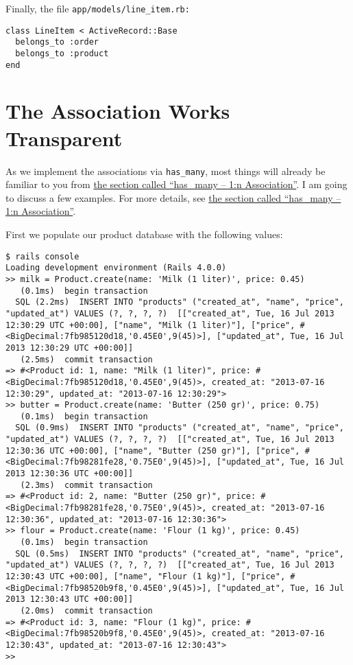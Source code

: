 \documentclass[a4paper]{book}
\newcounter{tab}[chapter]
\begin{document}
Finally, the file \texttt{app/models/line\_item.rb:}

\begin{shaded}\begin{verbatim}
class LineItem < ActiveRecord::Base
  belongs_to :order
  belongs_to :product
end
\end{verbatim}\end{shaded}

\section{The Association Works Transparent}\label{the-association-works-transparent}

As we implement the associations via \texttt{has\_many}, most things will already be familiar to you from \hyperref[activerecordux5fhasux5fmany]{the section called “has\_many -- 1:n Association”}. I am going to discuss a few examples. For more details, see \hyperref[activerecordux5fhasux5fmany]{the section called “has\_many -- 1:n Association”}.

First we populate our product database with the following values:

\begin{shaded}\begin{verbatim}
$ rails console
Loading development environment (Rails 4.0.0)
>> milk = Product.create(name: 'Milk (1 liter)', price: 0.45)
   (0.1ms)  begin transaction
  SQL (2.2ms)  INSERT INTO "products" ("created_at", "name", "price", "updated_at") VALUES (?, ?, ?, ?)  [["created_at", Tue, 16 Jul 2013 12:30:29 UTC +00:00], ["name", "Milk (1 liter)"], ["price", #<BigDecimal:7fb985120d18,'0.45E0',9(45)>], ["updated_at", Tue, 16 Jul 2013 12:30:29 UTC +00:00]]
   (2.5ms)  commit transaction
=> #<Product id: 1, name: "Milk (1 liter)", price: #<BigDecimal:7fb985120d18,'0.45E0',9(45)>, created_at: "2013-07-16 12:30:29", updated_at: "2013-07-16 12:30:29">
>> butter = Product.create(name: 'Butter (250 gr)', price: 0.75)
   (0.1ms)  begin transaction
  SQL (0.9ms)  INSERT INTO "products" ("created_at", "name", "price", "updated_at") VALUES (?, ?, ?, ?)  [["created_at", Tue, 16 Jul 2013 12:30:36 UTC +00:00], ["name", "Butter (250 gr)"], ["price", #<BigDecimal:7fb98281fe28,'0.75E0',9(45)>], ["updated_at", Tue, 16 Jul 2013 12:30:36 UTC +00:00]]
   (2.3ms)  commit transaction
=> #<Product id: 2, name: "Butter (250 gr)", price: #<BigDecimal:7fb98281fe28,'0.75E0',9(45)>, created_at: "2013-07-16 12:30:36", updated_at: "2013-07-16 12:30:36">
>> flour = Product.create(name: 'Flour (1 kg)', price: 0.45)
   (0.1ms)  begin transaction
  SQL (0.5ms)  INSERT INTO "products" ("created_at", "name", "price", "updated_at") VALUES (?, ?, ?, ?)  [["created_at", Tue, 16 Jul 2013 12:30:43 UTC +00:00], ["name", "Flour (1 kg)"], ["price", #<BigDecimal:7fb98520b9f8,'0.45E0',9(45)>], ["updated_at", Tue, 16 Jul 2013 12:30:43 UTC +00:00]]
   (2.0ms)  commit transaction
=> #<Product id: 3, name: "Flour (1 kg)", price: #<BigDecimal:7fb98520b9f8,'0.45E0',9(45)>, created_at: "2013-07-16 12:30:43", updated_at: "2013-07-16 12:30:43">
>>  
\end{verbatim}\end{shaded}
\end{document}
